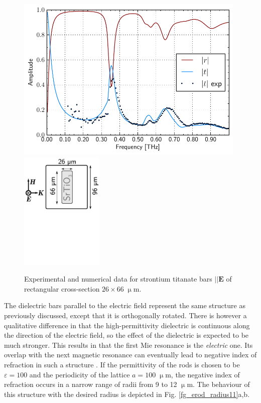 {\begin{figure}[ht] \caption{Experimental and numerical data for strontium titanate bars $||\mathbf E$ of rectangular cross-section $26 \times 66\;\upmu$m. }\label{fg_ebars_exp} \centering 
\includegraphics[width=11cm]{img/STObar_rt.pdf} 
\includegraphics[width=4cm]{img/EBars_STO_sketch.pdf}
\end{figure}
The dielectric bars parallel to the electric field represent the same structure as previously discussed, except that it is orthogonally rotated. There is however a qualitative difference in that the high-permittivity dielectric is continuous along the direction of the electric field, so the effect of the dielectric is expected to be much stronger. This results in that the first Mie resonance is the \textit{electric} one. Its overlap with the next magnetic resonance can eventually lead to negative index of refraction in such a structure \cite{peng2007, vynck2009}. If the permittivity of the rods is chosen to be $\varepsilon = 100$ and the periodicity of the lattice $a = 100\;\upmu$m, the negative index of refraction occurs in a narrow range of radii from 9 to 12 $\upmu$m. The behaviour of this structure with the desired radius is depicted in Fig. \ref{fg_erod_radius11}a,b.

}
